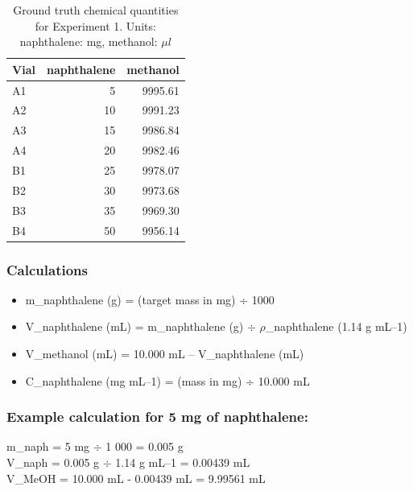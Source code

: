 \documentclass[sn-nature, twocolumn]{sn-jnl}%
\theoremstyle{thmstyleone}%
\theoremstyle{thmstyletwo}%
\theoremstyle{thmstylethree}%
\begin{document}
\begin{table}[!htb]
    \centering
    \scriptsize
    \begin{tabular}{lrr}
    \toprule
    Vial & naphthalene & methanol \\
    \midrule
    A1 & 5 & 9995.61 \\
    A2 & 10 & 9991.23 \\
    A3 & 15 & 9986.84 \\
    A4 & 20 & 9982.46 \\
    B1 & 25 & 9978.07 \\
    B2 & 30 & 9973.68 \\
    B3 & 35 & 9969.30 \\
    B4 & 50 & 9956.14 \\
    \bottomrule
    \end{tabular}
    \caption{Ground truth chemical quantities for Experiment 1. Units: naphthalene: mg, methanol: $\mu l$}
    \label{tab:placeholder}
\end{table}


 
\subsubsection*{Calculations}
\begin{itemize}
    \item m\_naphthalene (g) = (target mass in mg) ÷ 1000
    \item V\_naphthalene (mL) = m\_naphthalene (g) $\div$ $\rho$\_naphthalene (1.14 g mL–1)
    \item V\_methanol (mL) = 10.000 mL – V\_naphthalene (mL)
    \item C\_naphthalene (mg mL–1) = (mass in mg) ÷ 10.000 mL
\end{itemize}

\subsubsection*{Example calculation for 5 mg of naphthalene:}
m\_naph = 5 mg $\div$ 1 000 = 0.005 g \\
V\_naph = 0.005 g $\div$ 1.14 g mL–1 = 0.00439 mL \\
V\_MeOH = 10.000 mL - 0.00439 mL = 9.99561 mL \\
\end{document}

